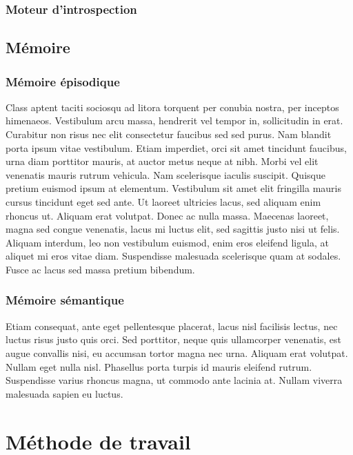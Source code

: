 \subsubsection{Moteur d'introspection}

\subsection{Mémoire}
\subsubsection{Mémoire épisodique}

Class aptent taciti sociosqu ad litora torquent per conubia nostra, per inceptos himenaeos. Vestibulum arcu massa, hendrerit vel tempor in, sollicitudin in erat. Curabitur non risus nec elit consectetur faucibus sed sed purus. Nam blandit porta ipsum vitae vestibulum. Etiam imperdiet, orci sit amet tincidunt faucibus, urna diam porttitor mauris, at auctor metus neque at nibh. Morbi vel elit venenatis mauris rutrum vehicula. Nam scelerisque iaculis suscipit. Quisque pretium euismod ipsum at elementum. Vestibulum sit amet elit fringilla mauris cursus tincidunt eget sed ante. Ut laoreet ultricies lacus, sed aliquam enim rhoncus ut. Aliquam erat volutpat. Donec ac nulla massa. Maecenas laoreet, magna sed congue venenatis, lacus mi luctus elit, sed sagittis justo nisi ut felis. Aliquam interdum, leo non vestibulum euismod, enim eros eleifend ligula, at aliquet mi eros vitae diam. Suspendisse malesuada scelerisque quam at sodales. Fusce ac lacus sed massa pretium bibendum. 

\subsubsection{Mémoire sémantique}

Etiam consequat, ante eget pellentesque placerat, lacus nisl facilisis lectus, nec luctus risus justo quis orci. Sed porttitor, neque quis ullamcorper venenatis, est augue convallis nisi, eu accumsan tortor magna nec urna. Aliquam erat volutpat. Nullam eget nulla nisl. Phasellus porta turpis id mauris eleifend rutrum. Suspendisse varius rhoncus magna, ut commodo ante lacinia at. Nullam viverra malesuada sapien eu luctus. 

\section{Méthode de travail}


